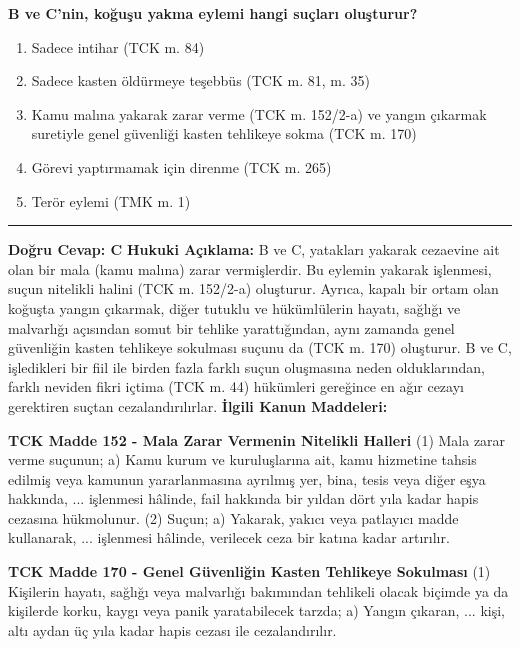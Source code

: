\documentclass[a4paper, 11pt, twocolumn]{article}
\newenvironment{lawbox}{%
    \par\noindent
    \begin{tcolorbox}[
        colback=lawbg,
        colframe=boxcolor,
        fonttitle=\bfseries,
        boxrule=0.5pt,
        left=3pt,
        right=3pt,
        top=3pt,
        bottom=3pt,
        width=\columnwidth,
        arc=2pt,
        before skip=0.2cm,
        after skip=0.2cm
    ]
    \footnotesize\itshape
}{\end{tcolorbox}}
\begin{document}
\textbf{B ve C'nin, koğuşu yakma eylemi hangi suçları oluşturur?}
\begin{enumerate}[label=\Alph*)]
    \item Sadece intihar (TCK m. 84)
    \item Sadece kasten öldürmeye teşebbüs (TCK m. 81, m. 35)
    \item Kamu malına yakarak zarar verme (TCK m. 152/2-a) ve yangın çıkarmak suretiyle genel güvenliği kasten tehlikeye sokma (TCK m. 170)
    \item Görevi yaptırmamak için direnme (TCK m. 265)
    \item Terör eylemi (TMK m. 1)
\end{enumerate}
\vspace{0.5cm}
\hrule
\vspace{0.5cm}
\textbf{Doğru Cevap: C}
\newline
\textbf{Hukuki Açıklama:} B ve C, yatakları yakarak cezaevine ait olan bir mala (kamu malına) zarar vermişlerdir. Bu eylemin yakarak işlenmesi, suçun nitelikli halini (TCK m. 152/2-a) oluşturur. Ayrıca, kapalı bir ortam olan koğuşta yangın çıkarmak, diğer tutuklu ve hükümlülerin hayatı, sağlığı ve malvarlığı açısından somut bir tehlike yarattığından, aynı zamanda genel güvenliğin kasten tehlikeye sokulması suçunu da (TCK m. 170) oluşturur. B ve C, işledikleri bir fiil ile birden fazla farklı suçun oluşmasına neden olduklarından, farklı neviden fikri içtima (TCK m. 44) hükümleri gereğince en ağır cezayı gerektiren suçtan cezalandırılırlar.
\vspace{0.5cm}
\textbf{İlgili Kanun Maddeleri:}
\begin{lawbox}
\textbf{TCK Madde 152 - Mala Zarar Vermenin Nitelikli Halleri}
\newline
(1) Mala zarar verme suçunun; a) Kamu kurum ve kuruluşlarına ait, kamu hizmetine tahsis edilmiş veya kamunun yararlanmasına ayrılmış yer, bina, tesis veya diğer eşya hakkında, ... işlenmesi hâlinde, fail hakkında bir yıldan dört yıla kadar hapis cezasına hükmolunur.
\newline
(2) Suçun; a) Yakarak, yakıcı veya patlayıcı madde kullanarak, ... işlenmesi hâlinde, verilecek ceza bir katına kadar artırılır.
\end{lawbox}
\begin{lawbox}
\textbf{TCK Madde 170 - Genel Güvenliğin Kasten Tehlikeye Sokulması}
\newline
(1) Kişilerin hayatı, sağlığı veya malvarlığı bakımından tehlikeli olacak biçimde ya da kişilerde korku, kaygı veya panik yaratabilecek tarzda; a) Yangın çıkaran, ... kişi, altı aydan üç yıla kadar hapis cezası ile cezalandırılır.
\end{lawbox}
\end{document}
